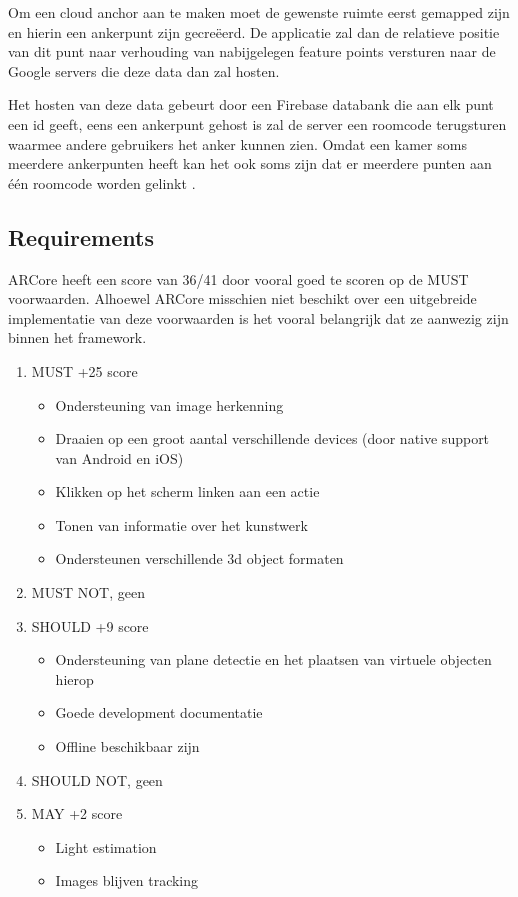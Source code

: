 Om een cloud anchor aan te maken moet de gewenste ruimte eerst gemapped zijn en hierin een ankerpunt zijn gecreëerd. De applicatie zal dan de relatieve positie van dit punt naar verhouding van nabijgelegen feature points versturen naar de Google servers die deze data dan zal hosten. 

Het hosten van deze data gebeurt door een Firebase databank die aan elk punt een id geeft, eens een ankerpunt gehost is zal de server een roomcode terugsturen waarmee andere gebruikers het anker kunnen zien. Omdat een kamer soms meerdere ankerpunten heeft kan het ook soms zijn dat er meerdere punten aan één roomcode worden gelinkt \autocite{ARCoreCloudAnchors}.

\subsection{Requirements}
ARCore heeft een score van 36/41 door vooral goed te scoren op de MUST voorwaarden. Alhoewel ARCore misschien niet beschikt over een uitgebreide implementatie van deze voorwaarden is het vooral belangrijk dat ze aanwezig zijn binnen het framework.
\begin{enumerate}
    \item MUST +25 score
    \begin{itemize}
       \item Ondersteuning van image herkenning
       \item Draaien op een groot aantal verschillende devices (door native support van Android en iOS)
       \item Klikken op het scherm linken aan een actie 
       \item Tonen van informatie over het kunstwerk
       \item Ondersteunen verschillende 3d object formaten
    \end{itemize}
    \item MUST NOT, geen
    \item SHOULD +9 score
    \begin{itemize}
    \item Ondersteuning van plane detectie en het plaatsen van virtuele objecten hierop
    \item Goede development documentatie
    \item Offline beschikbaar zijn
    \end{itemize}
    \item SHOULD NOT, geen
    \item MAY +2 score
    \begin{itemize}
        \item Light estimation
        \item Images blijven tracking
    \end{itemize}
\end{enumerate}

